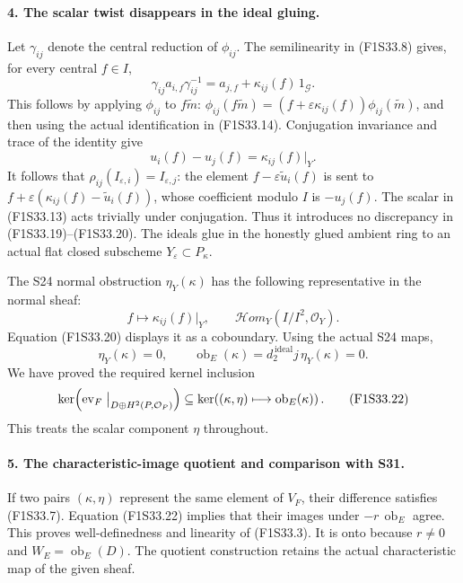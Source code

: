 \paragraph{4. The scalar twist disappears in the ideal gluing.}
Let $\gamma_{ij}$ denote the central reduction of
$\phi_{ij}$. The semilinearity in (F1S33.8) gives,
for every central $f\in I$,
\[
 \gamma_{ij}a_{i,f}\gamma_{ij}^{-1}
     =a_{j,f}+\kappa_{ij}(f)\,1_{\mathcal G}.
 \tag{F1S33.19}
\]
This follows by applying $\phi_{ij}$ to
$f\widetilde m$:
$\phi_{ij}(f\widetilde m)
 =(f+\varepsilon\kappa_{ij}(f))\phi_{ij}(\widetilde m)$,
and then using the actual identification in
(F1S33.14).
Conjugation invariance and trace of the identity
give
\[
       u_i(f)-u_j(f)=\kappa_{ij}(f)|_Y.
 \tag{F1S33.20}
\]
It follows that
$\rho_{ij}(I_{\varepsilon,i})=I_{\varepsilon,j}$:
the element $f-\varepsilon\widetilde u_i(f)$ is
sent to
$f+\varepsilon(\kappa_{ij}(f)-\widetilde u_i(f))$,
whose coefficient modulo $I$ is $-u_j(f)$.
The scalar in (F1S33.13) acts trivially under
conjugation. Thus it introduces no discrepancy
in (F1S33.19)--(F1S33.20).
The ideals glue in the honestly glued ambient
ring to an actual flat closed subscheme
$Y_\varepsilon\subset P_\kappa$.

The S24 normal obstruction $\eta_Y(\kappa)$ has
the following representative in the normal sheaf:
\[
  f\longmapsto\kappa_{ij}(f)|_Y,\qquad
  \mathcal Hom_Y(I/I^2,\mathcal O_Y).
\]
Equation (F1S33.20) displays it as a coboundary.
Using the actual S24 maps,
\[
 \eta_Y(\kappa)=0,\qquad
 \operatorname{ob}_E(\kappa)
       =d_2^{\,\mathrm{ideal}}j\,\eta_Y(\kappa)=0.
 \tag{F1S33.21}
\]
We have proved the required kernel inclusion
\[
 \ker\!\left(\operatorname{ev}_F\bigm|
                  _{D\oplus H^2(P,\mathcal O_P)}\right)
       \subseteq
 \ker\!\left((\kappa,\eta)\longmapsto
                               \operatorname{ob}_E(\kappa)\right).
 \tag{F1S33.22}
\]
This treats the scalar component $\eta$ throughout.

\paragraph{5. The characteristic-image quotient and comparison with S31.}
If two pairs $(\kappa,\eta)$ represent the same
element of $V_F$, their difference satisfies
(F1S33.7). Equation (F1S33.22) implies that their
images under $-r\,\operatorname{ob}_E$ agree.
This proves well-definedness and linearity of
(F1S33.3). It is onto because $r\ne0$ and
$W_E=\operatorname{ob}_E(D)$.
The quotient construction retains the actual
characteristic map of the given sheaf.

